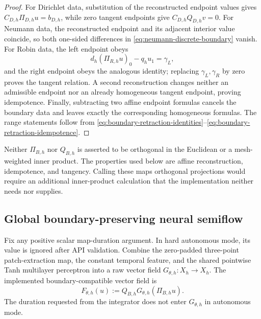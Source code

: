 \begin{proof}
For Dirichlet data, substitution of the reconstructed endpoint values gives $C_{D,h}\Pi_{D,h}u=b_{D,h}$, while zero tangent endpoints give $C_{D,h}Q_{D,h}v=0$.  For Neumann data, the reconstructed endpoint and its adjacent interior value coincide, so both one-sided differences in \eqref{eq:neumann-discrete-boundary} vanish.  For Robin data, the left endpoint obeys
\begin{equation*}
d_h(\Pi_{R,h}u)_0-q_hu_1=\gamma_L,
\end{equation*}
and the right endpoint obeys the analogous identity; replacing $\gamma_L,\gamma_R$ by zero proves the tangent relation.  A second reconstruction changes neither an admissible endpoint nor an already homogeneous tangent endpoint, proving idempotence.  Finally, subtracting two affine endpoint formulas cancels the boundary data and leaves exactly the corresponding homogeneous formulas.  The range statements follow from \eqref{eq:boundary-retraction-identities}--\eqref{eq:boundary-retraction-idempotence}.
\end{proof}

\begin{remark}\label{rem:boundary-not-orthogonal}
Neither $\Pi_{B,h}$ nor $Q_{B,h}$ is asserted to be orthogonal in the Euclidean or a mesh-weighted inner product.  The properties used below are affine reconstruction, idempotence, and tangency.  Calling these maps orthogonal projections would require an additional inner-product calculation that the implementation neither needs nor supplies.
\end{remark}

\subsection{Global boundary-preserving neural semiflow}

Fix any positive scalar map-duration argument.  In hard autonomous mode, its value is ignored after API validation.  Combine the zero-padded three-point patch-extraction map, the constant temporal feature, and the shared pointwise Tanh multilayer perceptron into a raw vector field $G_{\theta,h}:X_h\to X_h$.  The implemented boundary-compatible vector field is
\begin{equation}\label{eq:hard-autonomous-generator}
F_{\theta,h}(u):=Q_{B,h}G_{\theta,h}(\Pi_{B,h}u).
\end{equation}
The duration requested from the integrator does not enter $G_{\theta,h}$ in autonomous mode.

